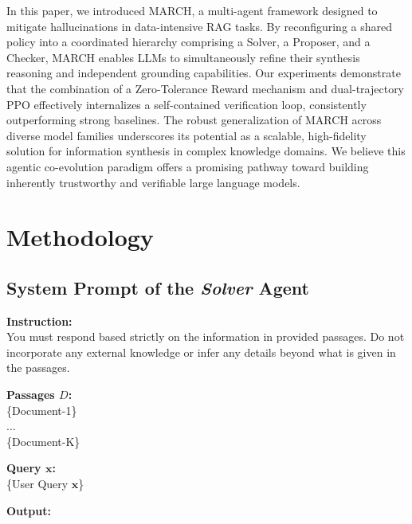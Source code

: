 \documentclass[10pt, a4paper, logo]{googledeepmind} %
\begin{document}
In this paper, we introduced MARCH, a multi-agent framework designed to mitigate hallucinations in data-intensive RAG tasks. By reconfiguring a shared policy into a coordinated hierarchy comprising a Solver, a Proposer, and a Checker, MARCH enables LLMs to simultaneously refine their synthesis reasoning and independent grounding capabilities. Our experiments demonstrate that the combination of a Zero-Tolerance Reward mechanism and dual-trajectory PPO effectively internalizes a self-contained verification loop, consistently outperforming strong baselines. The robust generalization of MARCH across diverse model families underscores its potential as a scalable, high-fidelity solution for information synthesis in complex knowledge domains. We believe this agentic co-evolution paradigm offers a promising pathway toward building inherently trustworthy and verifiable large language models.




\appendix

\section{Methodology}
\subsection{System Prompt of the \textit{Solver} Agent}\label{app:answer_prompt}

\begin{tcolorbox}[
    enhanced,
    colback=promptpurple,          %
    colframe=bordergray,           %
    boxrule=1pt,                   %
    sharp corners,                 %
    fontupper=\ttfamily,           %
    left=15pt,                     %
    right=15pt,                    %
    top=12pt,                      %
    bottom=12pt                    %
]
\begin{flushleft}
    \textbf{Instruction:} \\
    You must respond based strictly on the information in provided passages. 
    Do not incorporate any external knowledge or infer any details beyond what is given in the passages. \\
    \vspace{1em}
    
    \textbf{Passages $D$:} \\
    \{Document-1\} \\
    ... \\
    \{Document-K\} \\
    \vspace{1em}
    
    \textbf{Query $\mathbf{x}$:} \\
    \{User Query $\mathbf{x}$\} \\
    \vspace{1em}
    
    \textbf{Output:}
\end{flushleft}
\end{tcolorbox}
\end{document}
